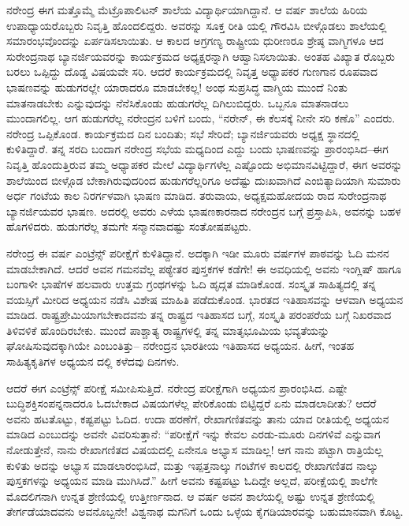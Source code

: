 ನರೇಂದ್ರ ಈಗ ಮತ್ತೊಮ್ಮೆ ಮೆಟ್ರೊಪಾಲಿಟನ್ ಶಾಲೆಯ ವಿದ್ಯಾರ್ಥಿಯಾಗಿದ್ದಾನೆ. ಆ ವರ್ಷ ಶಾಲೆಯ ಹಿರಿಯ ಉಪಾಧ್ಯಾಯರೊಬ್ಬರು ನಿವೃತ್ತಿ ಹೊಂದಲಿದ್ದರು. ಅವರನ್ನು ಸೂಕ್ತ ರೀತಿ ಯಲ್ಲಿ ಗೌರವಿಸಿ ಬೀಳ್ಗೊಡಲು ಶಾಲೆಯಲ್ಲಿ ಸಮಾರಂಭವೊಂದನ್ನು ಏರ್ಪಡಿಸಲಾಯಿತು. ಆ ಕಾಲದ ಅಗ್ರಗಣ್ಯ ರಾಷ್ಟ್ರೀಯ ಧುರೀಣರೂ ಶ್ರೇಷ್ಠ ವಾಗ್ಮಿಗಳೂ ಆದ ಸುರೇಂದ್ರನಾಥ ಬ್ಯಾನರ್ಜಿಯವರನ್ನು ಕಾರ್ಯಕ್ರಮದ ಅಧ್ಯಕ್ಷರನ್ನಾಗಿ ಆಹ್ವಾನಿಸಲಾಯಿತು. ಅಂತಹ ವಿಖ್ಯಾತ ರೊಬ್ಬರು ಬರಲು ಒಪ್ಪಿದ್ದು ದೊಡ್ಡ ವಿಷಯವೇ ಸರಿ. ಆದರೆ ಕಾರ್ಯಕ್ರಮದಲ್ಲಿ ನಿವೃತ್ತ ಅಧ್ಯಾಪಕರ ಗುಣಗಾನ ರೂಪವಾದ ಭಾಷಣವನ್ನು ಹುಡುಗರಲ್ಲೇ ಯಾರಾದರೂ ಮಾಡಬೇಕಲ್ಲ! ಅಂಥ ಸುಪ್ರಸಿದ್ಧ ವಾಗ್ಮಿಯ ಮುಂದೆ ನಿಂತು ಮಾತನಾಡಬೇಕು ಎನ್ನುವುದನ್ನು ನೆನೆಸಿಕೊಂಡು ಹುಡುಗರೆಲ್ಲ ದಿಗಿಲುಬಿದ್ದರು. ಒಬ್ಬನೂ ಮಾತನಾಡಲು ಮುಂದಾಗಲಿಲ್ಲ. ಆಗ ಹುಡುಗರೆಲ್ಲ ನರೇಂದ್ರನ ಬಳಿಗೆ ಬಂದು, “ನರೇನ್, ಈ ಕೆಲಸಕ್ಕೆ ನೀನೇ ಸರಿ ಕಣೊ” ಎಂದರು. ನರೇಂದ್ರ ಒಪ್ಪಿಕೊಂಡ. ಕಾರ್ಯಕ್ರಮದ ದಿನ ಬಂದಿತು; ಸಭೆ ಸೇರಿದೆ; ಬ್ಯಾನರ್ಜಿಯವರು ಅಧ್ಯಕ್ಷ ಸ್ಥಾನದಲ್ಲಿ ಕುಳಿತಿದ್ದಾರೆ. ತನ್ನ ಸರದಿ ಬಂದಾಗ ನರೇಂದ್ರ ಸಭೆಯ ಮಧ್ಯದಿಂದ ಎದ್ದು ಬಂದು ಭಾಷಣವನ್ನು ಪ್ರಾರಂಭಿಸಿದ–ಈಗ ನಿವೃತ್ತಿ ಹೊಂದುತ್ತಿರುವ ತಮ್ಮ ಅಧ್ಯಾಪಕರ ಮೇಲೆ ವಿದ್ಯಾರ್ಥಿಗಳೆಲ್ಲ ಎಷ್ಟೊಂದು ಅಭಿಮಾನವಿಟ್ಟಿದ್ದಾರೆ, ಈಗ ಅವರನ್ನು ಶಾಲೆಯಿಂದ ಬೀಳ್ಗೊಡ ಬೇಕಾಗಿರುವುದರಿಂದ ಹುಡುಗರೆಲ್ಲರಿಗೂ ಅದೆಷ್ಟು ದುಃಖವಾಗಿದೆ ಎಂಬಿತ್ಯಾದಿಯಾಗಿ ಸುಮಾರು ಅರ್ಧ ಗಂಟೆಯ ಕಾಲ ನಿರರ್ಗಳವಾಗಿ ಭಾಷಣ ಮಾಡಿದ. ತರುವಾಯ, ಅಧ್ಯಕ್ಷಮಹೋದಯ ರಾದ ಸುರೇಂದ್ರನಾಥ ಬ್ಯಾನರ್ಜಿಯವರ ಭಾಷಣ. ಅದರಲ್ಲಿ ಅವರು ಎಳೆಯ ಭಾಷಣಕಾರನಾದ ನರೇಂದ್ರನ ಬಗ್ಗೆ ಪ್ರಸ್ತಾಪಿಸಿ, ಅವನನ್ನು ಬಹಳ ಹೊಗಳಿದರು. ಹುಡುಗರೆಲ್ಲ ತಮಗೇ ಸನ್ಮಾನವಾದಷ್ಟು ಸಂತೋಷಪಟ್ಟರು.

ನರೇಂದ್ರ ಈ ವರ್ಷ ಎಂಟ್ರೆನ್ಸ್ ಪರೀಕ್ಷೆಗೆ ಕುಳಿತಿದ್ದಾನೆ. ಅದಕ್ಕಾಗಿ ಇಡೀ ಮೂರು ವರ್ಷಗಳ ಪಾಠವನ್ನು ಓದಿ ಮನನ ಮಾಡಬೇಕಾಗಿದೆ. ಆದರೆ ಅವನ ಗಮನವೆಲ್ಲ ಪಠ್ಯೇತರ ಪುಸ್ತಕಗಳ ಕಡೆಗೇ! ಈ ಅವಧಿಯಲ್ಲಿ ಅವನು ಇಂಗ್ಲಿಷ್ ಹಾಗೂ ಬಂಗಾಳೀ ಭಾಷೆಗಳ ಹಲವಾರು ಉತ್ತಮ ಗ್ರಂಥಗಳನ್ನು ಓದಿ ಹೃದ್ಗತ ಮಾಡಿಕೊಂಡ. ಸಂಸ್ಕೃತ ಸಾಹಿತ್ಯದಲ್ಲಿ ತನ್ನ ವಯಸ್ಸಿಗೆ ಮೀರಿದ ಅಧ್ಯಯನ ನಡೆಸಿ ವಿಶೇಷ ಮಾಹಿತಿ ಪಡೆದುಕೊಂಡ. ಭಾರತದ ಇತಿಹಾಸವನ್ನು ಆಳವಾಗಿ ಅಧ್ಯಯನ ಮಾಡಿದ. ರಾಷ್ಟ್ರಪ್ರೇಮಿಯಾಗಬೇಕಾದವನು ತನ್ನ ರಾಷ್ಟ್ರದ ಇತಿಹಾಸದ ಬಗ್ಗೆ, ಸಂಸ್ಕೃತಿ ಪರಂಪರೆಯ ಬಗ್ಗೆ ನಿಖರವಾದ ತಿಳಿವಳಿಕೆ ಹೊಂದಿರಬೇಕು. ಮುಂದೆ ಪಾಶ್ಚಾತ್ಯ ರಾಷ್ಟ್ರಗಳಲ್ಲಿ ತನ್ನ ಮಾತೃಭೂಮಿಯ ಭವ್ಯತೆಯನ್ನು ಘೋಷಿಸುವುದಕ್ಕಾಗಿಯೇ ಎಂಬಂತಿತ್ತು– ನರೇಂದ್ರನ ಭಾರತೀಯ ಇತಿಹಾಸದ ಅಧ್ಯಯನ. ಹೀಗೆ, ಇಂತಹ ಸಾಹಿತ್ಯಕೃತಿಗಳ ಅಧ್ಯಯನ ದಲ್ಲಿ ಕಳೆದವು ದಿನಗಳು.

ಆದರೆ ಈಗ ಎಂಟ್ರೆನ್ಸ್ ಪರೀಕ್ಷೆ ಸಮೀಪಿಸುತ್ತಿದೆ. ನರೇಂದ್ರ ಪರೀಕ್ಷೆಗಾಗಿ ಅಧ್ಯಯನ ಪ್ರಾರಂಭಿಸಿದ. ಎಷ್ಟೇ ಬುದ್ಧಿಶಕ್ತಿಸಂಪನ್ನನಾದರೂ ಓದಬೇಕಾದ ವಿಷಯಗಳೆಲ್ಲ ಪೇರಿಕೊಂಡು ಬಿಟ್ಟಿದ್ದರೆ ಏನು ಮಾಡಲಾದೀತು? ಆದರೆ ಅವನು ಹಟತೊಟ್ಟು, ಕಷ್ಟಪಟ್ಟು ಓದಿದ. ಉದಾ ಹರಣೆಗೆ, ರೇಖಾಗಣಿತವನ್ನು ತಾನು ಯಾವ ರೀತಿಯಲ್ಲಿ ಅಧ್ಯಯನ ಮಾಡಿದ ಎಂಬುದನ್ನು ಅವನೇ ವಿವರಿಸುತ್ತಾನೆ: “ಪರೀಕ್ಷೆಗೆ ಇನ್ನು ಕೇವಲ ಎರಡು-ಮೂರು ದಿನಗಳಿವೆ ಎನ್ನುವಾಗ ನೋಡುತ್ತೇನೆ, ನಾನು ರೇಖಾಗಣಿತದ ವಿಷಯದಲ್ಲಿ ಏನೇನೂ ಅಭ್ಯಾಸ ಮಾಡಿಲ್ಲ! ಆಗ ನಾನು ಪಟ್ಟಾಗಿ ರಾತ್ರಿಯೆಲ್ಲ ಕುಳಿತು ಅದನ್ನು ಅಭ್ಯಾಸ ಮಾಡಲಾರಂಭಿಸಿದೆ, ಮತ್ತು ಇಪ್ಪತ್ತನಾಲ್ಕು ಗಂಟೆಗಳ ಕಾಲದಲ್ಲಿ ರೇಖಾಗಣಿತದ ನಾಲ್ಕು ಪುಸ್ತಕಗಳನ್ನು ಅಧ್ಯಯನ ಮಾಡಿ ಮುಗಿಸಿದೆ.” ಹೀಗೆ ಅವನು ಕಷ್ಟಪಟ್ಟು ಓದಿದ್ದೇ ಅಲ್ಲದೆ, ಪರೀಕ್ಷೆಯಲ್ಲಿ ಶಾಲೆಗೇ ಮೊದಲಿಗನಾಗಿ ಉನ್ನತ ಶ್ರೇಣಿಯಲ್ಲಿ ಉತ್ತೀರ್ಣನಾದ. ಆ ವರ್ಷ ಅವನ ಶಾಲೆಯಲ್ಲಿ ಅಷ್ಟು ಉನ್ನತ ಶ್ರೇಣಿಯಲ್ಲಿ ತೇರ್ಗಡೆಯಾದವನು ಅವನೊಬ್ಬನೇ! ವಿಶ್ವನಾಥ ಮಗನಿಗೆ ಒಂದು ಒಳ್ಳೆಯ ಕೈಗಡಿಯಾರವನ್ನು ಬಹುಮಾನವಾಗಿ ಕೊಟ್ಟ.

